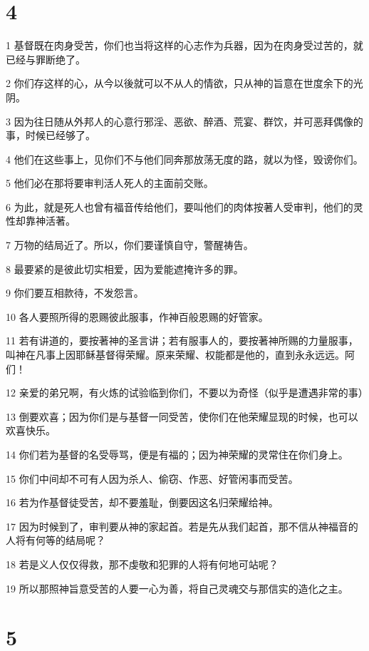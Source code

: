 \chapter{4}

\par 1 基督既在肉身受苦，你们也当将这样的心志作为兵器，因为在肉身受过苦的，就已经与罪断绝了。
\par 2 你们存这样的心，从今以後就可以不从人的情欲，只从神的旨意在世度余下的光阴。
\par 3 因为往日随从外邦人的心意行邪淫、恶欲、醉酒、荒宴、群饮，并可恶拜偶像的事，时候已经够了。
\par 4 他们在这些事上，见你们不与他们同奔那放荡无度的路，就以为怪，毁谤你们。
\par 5 他们必在那将要审判活人死人的主面前交账。
\par 6 为此，就是死人也曾有福音传给他们，要叫他们的肉体按著人受审判，他们的灵性却靠神活著。
\par 7 万物的结局近了。所以，你们要谨慎自守，警醒祷告。
\par 8 最要紧的是彼此切实相爱，因为爱能遮掩许多的罪。
\par 9 你们要互相款待，不发怨言。
\par 10 各人要照所得的恩赐彼此服事，作神百般恩赐的好管家。
\par 11 若有讲道的，要按著神的圣言讲；若有服事人的，要按著神所赐的力量服事，叫神在凡事上因耶稣基督得荣耀。原来荣耀、权能都是他的，直到永永远远。阿们！
\par 12 亲爱的弟兄啊，有火炼的试验临到你们，不要以为奇怪（似乎是遭遇非常的事）
\par 13 倒要欢喜；因为你们是与基督一同受苦，使你们在他荣耀显现的时候，也可以欢喜快乐。
\par 14 你们若为基督的名受辱骂，便是有福的；因为神荣耀的灵常住在你们身上。
\par 15 你们中间却不可有人因为杀人、偷窃、作恶、好管闲事而受苦。
\par 16 若为作基督徒受苦，却不要羞耻，倒要因这名归荣耀给神。
\par 17 因为时候到了，审判要从神的家起首。若是先从我们起首，那不信从神福音的人将有何等的结局呢？
\par 18 若是义人仅仅得救，那不虔敬和犯罪的人将有何地可站呢？
\par 19 所以那照神旨意受苦的人要一心为善，将自己灵魂交与那信实的造化之主。

\chapter{5}

